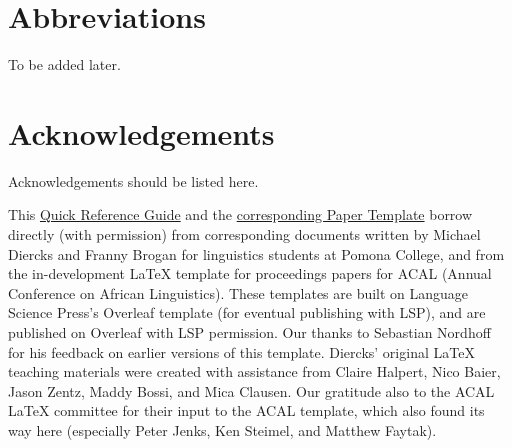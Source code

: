 \documentclass[output=paper,colorlinks,citecolor=brown]{langscibook}
\begin{document}
\section*{Abbreviations}

To be added later.


\section*{Acknowledgements}

Acknowledgements should be listed here.

\noindent This \href{https://www.overleaf.com/latex/templates/field-methods-papers-quick-reference-guide/cqbjxwnffvrm}{Quick Reference Guide} and the \href{https://www.overleaf.com/latex/templates/field-methods-paper-template/pqrxmrsptqcv}{corresponding Paper Template} borrow directly (with permission) from corresponding documents written by Michael Diercks and Franny Brogan for linguistics students at Pomona College, and from the in-development \LaTeX{} template for proceedings papers for ACAL (Annual Conference on African Linguistics). These templates are built on Language Science Press's Overleaf template (for eventual publishing with LSP), and are published on Overleaf with LSP permission. Our thanks to Sebastian Nordhoff for his feedback on earlier versions of this template. Diercks' original \LaTeX{} teaching materials were created with assistance from Claire Halpert, Nico Baier, Jason Zentz, Maddy Bossi, and Mica Clausen. Our gratitude also to the ACAL \LaTeX{} committee for their input to the ACAL template, which also found its way here (especially Peter Jenks, Ken Steimel, and Matthew Faytak). 

\printbibliography[heading=subbibliography,notkeyword=this]
\end{document}
